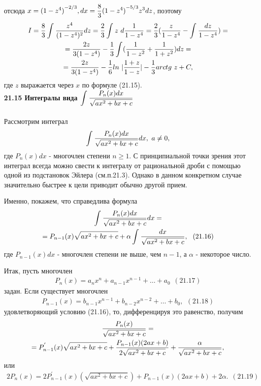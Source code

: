 \documentclass{article}
\begin{document}
 
 
отсюда $\displaystyle {x} = {(1 - z^4)}^{-2/3},{dx}={{8}\over{3}}{(1 - z^4)}^{-5/3}{z^3dz}$, поэтому
    \begin{gather*}
    I={{8}\over{3}}\int_{}^{}{{z^4}\over{(1-z^4)^2}}dz={{2}\over{3}}\int_{}^{}z \ d{{1}\over{1-z^4}}={2\over3}({{z}\over{1-z^4}}-\int_{}^{}{{dz}\over{1-z^4}})=
    \\
    ={{2z}\over{3(1-z^4)}}-{{1}\over{3}}\int_{}^{}({{1}\over{1-z^2}}+{{1}\over{1+z^2}})dz=
    \\
    ={{2z}\over{3(1-z^4)}}-{1\over6}ln \ |{{1+z}\over{1-z}}|-{1\over3}arctg \ z + C,
    \end{gather*}
    где $\displaystyle z$ выражается через $\displaystyle x$ по формуле (21.15).
    \\


\textbf{21.15 Интегралы вида $\displaystyle \int_{}^{} {{P_n(x)dx}\over{\sqrt{ax^2+bx+c}}}$} \\ \\ Рассмотрим интеграл
\begin{gather*} \int_{}^{} {{P_n(x)dx}\over{\sqrt{ax^2+bx+c}}}dx, \ a \ne 0, \end{gather*}
где $\displaystyle P_n(x)dx$ - многочлен степени $\displaystyle n \geq 1$. С принципиальной точки зрения этот интеграл всегда можно свести к интегралу от рациональной дроби с помощью одной из подстановок Эйлера (см.п.21.3). Однако в данном конкретном случае значительно быстрее к цели приводит обычно другой прием. \par
Именно, покажем, что справедлива формула
\begin{gather*} \int_{}^{} {{P_n(x)dx}\over{\sqrt{ax^2+bx+c}}}dx=
\\
={P_{n-1}(x)}\sqrt{ax^2+bx+c}+\alpha \int_{}^{} {{dx}\over{\sqrt{ax^2+bx+c}}}, \ \ (21.16) \end{gather*}
где $\displaystyle P_{n-1}(x)dx$ - многочлен степени не выше, чем $\displaystyle n-1$, а $\displaystyle \alpha $ - некоторое число.
\par
Итак, пусть многочлен
\begin{gather*} P_{n}(x)=a_nx^n+a_{n-1}x^{n-1}+\ldots +a_0 \ \ (21.17)\end{gather*}
задан. Если существует многочлен
\begin{gather*} P_{n-1}(x)=b_{n-1}x^{n-1}+b_{n-2}x^{n-2}+\ldots+b_0,\ \ (21.18)\end{gather*}
удовлетворяющий условию (21.16), то, дифференцируя это равенство, получим
\begin{gather*} {{P_n(x)}\over{\sqrt{ax^2+bx+c}}}=
\\
=P_{n-1}^{'}(x)\sqrt{ax^2+bx+c}+{{P_{n-1}(x)(2ax+b)}\over{2\sqrt{ax^2+bx+c}}}+{{\alpha}\over{\sqrt{ax^2+bx+c}}},\end{gather*}
или
\begin{gather*} 2P_{n}(x)=2P_{n-1}^{'}(x)(\sqrt{ax^2+bx+c})+P_{n-1}(x)(2ax+b)+2\alpha. \ \ (21.19)\end{gather*}
\end{document}
